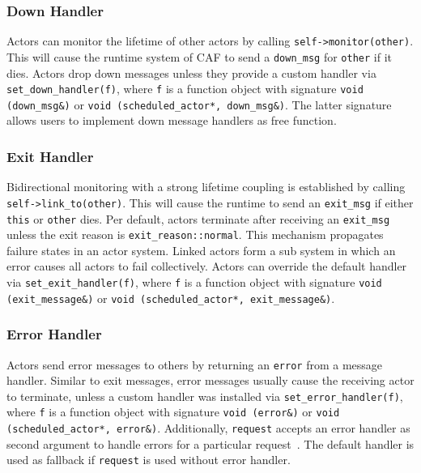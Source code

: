\subsubsection{Down  Handler}
\label{down-message}

Actors can monitor the lifetime of other actors by calling \lstinline^self->monitor(other)^. This will cause the runtime system of CAF to send a \lstinline^down_msg^ for \lstinline^other^ if it dies. Actors drop down messages unless they provide a custom handler via \lstinline^set_down_handler(f)^, where \lstinline^f^ is a function object with signature \lstinline^void (down_msg&)^ or \lstinline^void (scheduled_actor*, down_msg&)^. The latter signature allows users to implement down message handlers as free function.

\subsubsection{Exit Handler}
\label{exit-message}

Bidirectional monitoring with a strong lifetime coupling is established by calling \lstinline^self->link_to(other)^. This will cause the runtime to send an \lstinline^exit_msg^ if either \lstinline^this^ or \lstinline^other^ dies. Per default, actors terminate after receiving an \lstinline^exit_msg^ unless the exit reason is \lstinline^exit_reason::normal^. This mechanism propagates failure states in an actor system. Linked actors form a sub system in which an error causes all actors to fail collectively. Actors can override the default handler via \lstinline^set_exit_handler(f)^, where \lstinline^f^ is a function object with signature \lstinline^void (exit_message&)^ or \lstinline^void (scheduled_actor*, exit_message&)^.

\subsubsection{Error Handler}
\label{error-message}

Actors send error messages to others by returning an \lstinline^error^  from a message handler. Similar to exit messages, error messages usually cause the receiving actor to terminate, unless a custom handler was installed via \lstinline^set_error_handler(f)^, where \lstinline^f^ is a function object with signature \lstinline^void (error&)^ or \lstinline^void (scheduled_actor*, error&)^. Additionally, \lstinline^request^ accepts an error handler as second argument to handle errors for a particular request~. The default handler is used as fallback if \lstinline^request^ is used without error handler.

